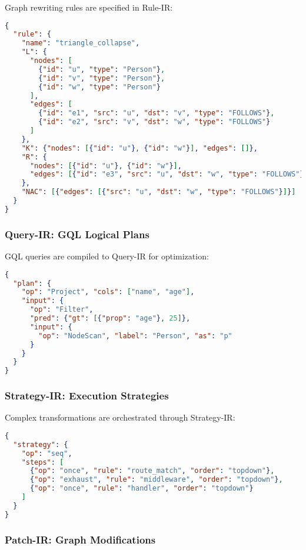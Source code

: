 \documentclass[11pt,a4paper]{article}
\begin{document}
Graph rewriting rules are specified in Rule-IR:

\begin{lstlisting}[language=json,caption=DPO Rule-IR example]
{
  "rule": {
    "name": "triangle_collapse",
    "L": {
      "nodes": [
        {"id": "u", "type": "Person"},
        {"id": "v", "type": "Person"},
        {"id": "w", "type": "Person"}
      ],
      "edges": [
        {"id": "e1", "src": "u", "dst": "v", "type": "FOLLOWS"},
        {"id": "e2", "src": "v", "dst": "w", "type": "FOLLOWS"}
      ]
    },
    "K": {"nodes": [{"id": "u"}, {"id": "w"}], "edges": []},
    "R": {
      "nodes": [{"id": "u"}, {"id": "w"}],
      "edges": [{"id": "e3", "src": "u", "dst": "w", "type": "FOLLOWS"}]
    },
    "NAC": [{"edges": [{"src": "u", "dst": "w", "type": "FOLLOWS"}]}]
  }
}
\end{lstlisting}

\subsubsection{Query-IR: GQL Logical Plans}
\label{subsubsec:query_ir}

GQL queries are compiled to Query-IR for optimization:

\begin{lstlisting}[language=json,caption=GQL Query-IR example]
{
  "plan": {
    "op": "Project", "cols": ["name", "age"],
    "input": {
      "op": "Filter",
      "pred": {"gt": [{"prop": "age"}, 25]},
      "input": {
        "op": "NodeScan", "label": "Person", "as": "p"
      }
    }
  }
}
\end{lstlisting}

\subsubsection{Strategy-IR: Execution Strategies}
\label{subsubsec:strategy_ir}

Complex transformations are orchestrated through Strategy-IR:

\begin{lstlisting}[language=json,caption=Strategy-IR example]
{
  "strategy": {
    "op": "seq",
    "steps": [
      {"op": "once", "rule": "route_match", "order": "topdown"},
      {"op": "exhaust", "rule": "middleware", "order": "topdown"},
      {"op": "once", "rule": "handler", "order": "topdown"}
    ]
  }
}
\end{lstlisting}

\subsubsection{Patch-IR: Graph Modifications}
\label{subsubsec:patch_ir}
\end{document}
